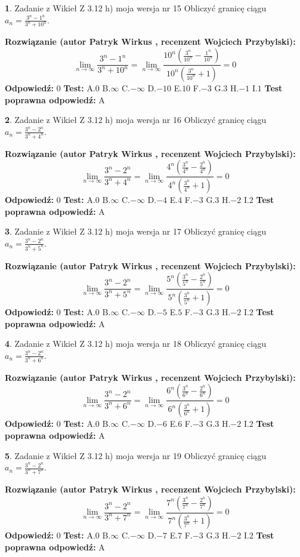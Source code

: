 \documentclass[12pt, a4paper]{article}
\theoremstyle{definition} %
\newtheorem{zad}{}
\newcommand{\zadStart}[1]{\begin{zad}#1\newline}
\newcommand{\zadStop}{\end{zad}}
\newcommand{\rozwStart}[2]{\noindent \textbf{Rozwiązanie (autor #1 , recenzent #2): }\newline}
\newcommand{\rozwStop}{\newline}
\newcommand{\odpStart}{\noindent \textbf{Odpowiedź:}\newline}
\newcommand{\odpStop}{\newline}
\newcommand{\testStart}{\noindent \textbf{Test:}\newline}
\newcommand{\testStop}{\newline}
\newcommand{\kluczStart}{\noindent \textbf{Test poprawna odpowiedź:}\newline}
\newcommand{\kluczStop}{\newline}
\begin{document}
\zadStart{Zadanie z Wikieł Z 3.12 h) moja wersja nr 15}
Obliczyć granicę ciągu $a_{n}=\frac{3^{n} - 1^{n}}{3^{n} + 10^{n}}$.
\zadStop
\rozwStart{Patryk Wirkus}{Wojciech Przybylski}
$$\lim\limits_{n\to\infty}\frac{3^{n} - 1^{n}}{3^{n} + 10^{n}} = \lim\limits_{n\to\infty}\frac{10^{n}(\frac{3^{n}}{10^{n}} - \frac{1^{n}}{10^{n}})}{10^{n}(\frac{3^{n}}{10^{n}} + 1)} = 0$$
\rozwStop
\odpStart
$0$
\odpStop
\testStart
A.$0$
B.$\infty$
C.$-\infty$
D.$-10$
E.$10$
F.$-3$
G.$3$
H.$-1$
I.$1$
\testStop
\kluczStart
A
\kluczStop



\zadStart{Zadanie z Wikieł Z 3.12 h) moja wersja nr 16}
Obliczyć granicę ciągu $a_{n}=\frac{3^{n} - 2^{n}}{3^{n} + 4^{n}}$.
\zadStop
\rozwStart{Patryk Wirkus}{Wojciech Przybylski}
$$\lim\limits_{n\to\infty}\frac{3^{n} - 2^{n}}{3^{n} + 4^{n}} = \lim\limits_{n\to\infty}\frac{4^{n}(\frac{3^{n}}{4^{n}} - \frac{2^{n}}{4^{n}})}{4^{n}(\frac{3^{n}}{4^{n}} + 1)} = 0$$
\rozwStop
\odpStart
$0$
\odpStop
\testStart
A.$0$
B.$\infty$
C.$-\infty$
D.$-4$
E.$4$
F.$-3$
G.$3$
H.$-2$
I.$2$
\testStop
\kluczStart
A
\kluczStop



\zadStart{Zadanie z Wikieł Z 3.12 h) moja wersja nr 17}
Obliczyć granicę ciągu $a_{n}=\frac{3^{n} - 2^{n}}{3^{n} + 5^{n}}$.
\zadStop
\rozwStart{Patryk Wirkus}{Wojciech Przybylski}
$$\lim\limits_{n\to\infty}\frac{3^{n} - 2^{n}}{3^{n} + 5^{n}} = \lim\limits_{n\to\infty}\frac{5^{n}(\frac{3^{n}}{5^{n}} - \frac{2^{n}}{5^{n}})}{5^{n}(\frac{3^{n}}{5^{n}} + 1)} = 0$$
\rozwStop
\odpStart
$0$
\odpStop
\testStart
A.$0$
B.$\infty$
C.$-\infty$
D.$-5$
E.$5$
F.$-3$
G.$3$
H.$-2$
I.$2$
\testStop
\kluczStart
A
\kluczStop



\zadStart{Zadanie z Wikieł Z 3.12 h) moja wersja nr 18}
Obliczyć granicę ciągu $a_{n}=\frac{3^{n} - 2^{n}}{3^{n} + 6^{n}}$.
\zadStop
\rozwStart{Patryk Wirkus}{Wojciech Przybylski}
$$\lim\limits_{n\to\infty}\frac{3^{n} - 2^{n}}{3^{n} + 6^{n}} = \lim\limits_{n\to\infty}\frac{6^{n}(\frac{3^{n}}{6^{n}} - \frac{2^{n}}{6^{n}})}{6^{n}(\frac{3^{n}}{6^{n}} + 1)} = 0$$
\rozwStop
\odpStart
$0$
\odpStop
\testStart
A.$0$
B.$\infty$
C.$-\infty$
D.$-6$
E.$6$
F.$-3$
G.$3$
H.$-2$
I.$2$
\testStop
\kluczStart
A
\kluczStop



\zadStart{Zadanie z Wikieł Z 3.12 h) moja wersja nr 19}
Obliczyć granicę ciągu $a_{n}=\frac{3^{n} - 2^{n}}{3^{n} + 7^{n}}$.
\zadStop
\rozwStart{Patryk Wirkus}{Wojciech Przybylski}
$$\lim\limits_{n\to\infty}\frac{3^{n} - 2^{n}}{3^{n} + 7^{n}} = \lim\limits_{n\to\infty}\frac{7^{n}(\frac{3^{n}}{7^{n}} - \frac{2^{n}}{7^{n}})}{7^{n}(\frac{3^{n}}{7^{n}} + 1)} = 0$$
\rozwStop
\odpStart
$0$
\odpStop
\testStart
A.$0$
B.$\infty$
C.$-\infty$
D.$-7$
E.$7$
F.$-3$
G.$3$
H.$-2$
I.$2$
\testStop
\kluczStart
A
\kluczStop
\end{document}
